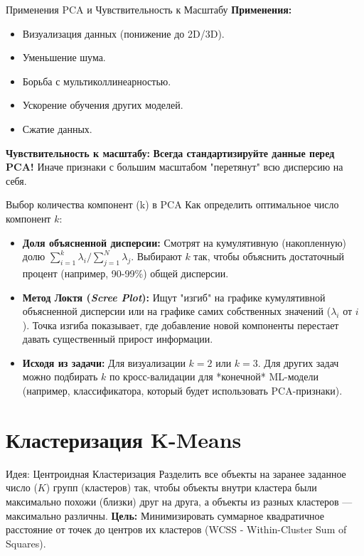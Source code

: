 \begin{alerttextbox}{Применения PCA и Чувствительность к Масштабу}
    \textbf{Применения:}
    \begin{itemize}[nosep, leftmargin=*]
        \item Визуализация данных (понижение до 2D/3D).
        \item Уменьшение шума.
        \item Борьба с мультиколлинеарностью.
        \item Ускорение обучения других моделей.
        \item Сжатие данных.
    \end{itemize}
    \textbf{Чувствительность к масштабу:} \textbf{Всегда стандартизируйте данные перед PCA!} Иначе признаки с большим масштабом "перетянут" всю дисперсию на себя.
\end{alerttextbox}

\begin{textbox}{Выбор количества компонент (k) в PCA}
    Как определить оптимальное число компонент $k$:
    \begin{itemize}[nosep, itemsep=0.5ex, leftmargin=*]
        \item \textbf{Доля объясненной дисперсии:} Смотрят на кумулятивную (накопленную) долю $\sum_{i=1}^{k} \lambda_i / \sum_{j=1}^{N} \lambda_j$. Выбирают $k$ так, чтобы объяснить достаточный процент (например, 90-99\%) общей дисперсии.
        \item \textbf{Метод Локтя (\textit{Scree Plot}):} Ищут "изгиб" на графике кумулятивной объясненной дисперсии или на графике самих собственных значений ($\lambda_i$ от $i$). Точка изгиба показывает, где добавление новой компоненты перестает давать существенный прирост информации.
        \item \textbf{Исходя из задачи:} Для визуализации $k=2$ или $k=3$. Для других задач можно подбирать $k$ по кросс-валидации для *конечной* ML-модели (например, классификатора, который будет использовать PCA-признаки).
    \end{itemize}
\end{textbox}

\section{Кластеризация K-Means}

\begin{myblock}{Идея: Центроидная Кластеризация}
    Разделить все объекты на заранее заданное число ($K$) групп (кластеров) так, чтобы объекты внутри кластера были максимально похожи (близки) друг на друга, а объекты из разных кластеров — максимально различны.
    \vspace{0.5ex}
    \textbf{Цель:} Минимизировать суммарное квадратичное расстояние от точек до центров их кластеров (WCSS - Within-Cluster Sum of Squares).
\end{myblock}

